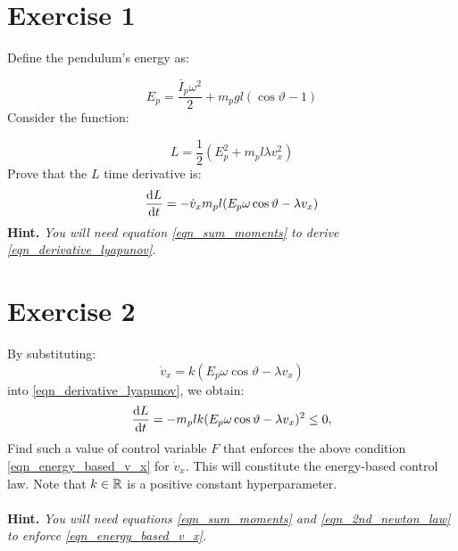 \documentclass[12pt]{article}
\begin{document}
\section*{Exercise 1}

Define the pendulum's energy as:

$$
E_p =  \frac{\overline{I}_p \omega ^ 2}{2}   + m_p g l (\cos{\vartheta} - 1)
$$
Consider the function:

\begin{equation}
    L = \frac{1}{2}(E_p^2 + m_p l\lambda v_x ^ 2)
\end{equation}
Prove that the $L$ time derivative is: 
\begin{equation}
\label{eqn_derivative_lyapunov}
\frac{\mathop{}\!\mathrm{d} L}{\mathop{}\!\mathrm{d} t} = - \dot{v}_x m_p l (E_p \omega \cos \vartheta - \lambda v_x)
\end{equation}
\textbf{Hint.} \textit{You will need equation \eqref{eqn_sum_moments} to derive \eqref{eqn_derivative_lyapunov}.}

\section*{Exercise 2}

By substituting:
\begin{equation}
\label{eqn_energy_based_v_x}
\dot{v}_x = k (E_p \omega \cos \vartheta - \lambda v_x)
\end{equation}
into \eqref{eqn_derivative_lyapunov}, we obtain:
$$
\frac{\mathop{}\!\mathrm{d} L}{\mathop{}\!\mathrm{d} t} = - m_p lk (E_p\omega \cos \vartheta  - \lambda v_x)^2 \leq 0,
$$
Find such a value of control variable $F$ that enforces the above condition \eqref{eqn_energy_based_v_x} for $\dot{v}_x$. 
This will constitute the energy-based control law. Note that $k\in {\mathbb{R}}$ is a positive constant hyperparameter.
\\
\\
\textbf{Hint.} \textit{You will need equations \eqref{eqn_sum_moments} and \eqref{eqn_2nd_newton_law} to enforce \eqref{eqn_energy_based_v_x}.}
\end{document}
